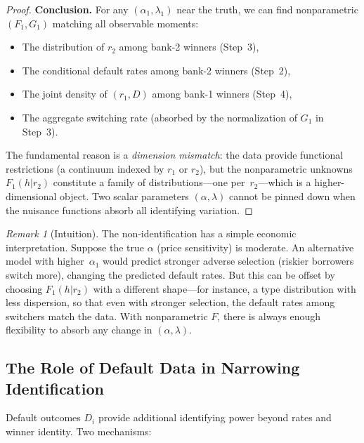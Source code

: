 \documentclass[12pt]{article}
\theoremstyle{plain}
\theoremstyle{plain}
\theoremstyle{definition}  %
\theoremstyle{remark}  %
\newtheorem{remark}[thm]{Remark}  %
\begin{document}
\begin{proof}
\medskip\noindent
\textbf{Conclusion.}  For any $(\alpha_1, \lambda_1)$ near the truth, we can find nonparametric $(F_1, G_1)$ matching all observable moments:
\begin{itemize}
    \item The distribution of $r_2$ among bank-2 winners (Step~3),
    \item The conditional default rates among bank-2 winners (Step~2),
    \item The joint density of $(r_1, D)$ among bank-1 winners (Step~4),
    \item The aggregate switching rate (absorbed by the normalization of $G_1$ in Step~3).
\end{itemize}
The fundamental reason is a \emph{dimension mismatch}: the data provide functional restrictions (a continuum indexed by $r_1$ or $r_2$), but the nonparametric unknowns $F_1(h|r_2)$ constitute a family of distributions---one per~$r_2$---which is a higher-dimensional object.  Two scalar parameters $(\alpha, \lambda)$ cannot be pinned down when the nuisance functions absorb all identifying variation.
\end{proof}

\begin{remark}[Intuition]
The non-identification has a simple economic interpretation.  Suppose the true $\alpha$ (price sensitivity) is moderate.  An alternative model with higher~$\alpha_1$ would predict stronger adverse selection (riskier borrowers switch more), changing the predicted default rates.  But this can be offset by choosing $F_1(h|r_2)$ with a different shape---for instance, a type distribution with less dispersion, so that even with stronger selection, the default rates among switchers match the data.  With nonparametric $F$, there is always enough flexibility to absorb any change in $(\alpha, \lambda)$.
\end{remark}


\subsection{The Role of Default Data in Narrowing Identification}\label{sec:defaults_nonpar}

Default outcomes $D_i$ provide additional identifying power beyond rates and winner identity. Two mechanisms:
\end{document}
